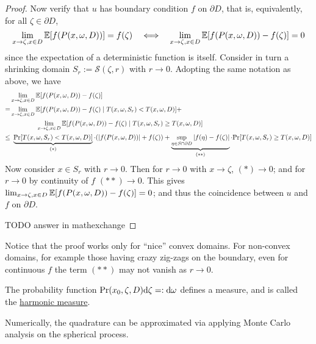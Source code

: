 \documentclass[10pt]{article}
\begin{document}
\begin{proof}
    Now verify that $u$ has boundary condition $f$ on $\partial D$, that is, equivalently, for all $\zeta \in \partial D$,
    \[
        \lim_{x \to \zeta, x \in D} \mathbb{E}[f(P(x, \omega, D))] = f(\zeta)
        \quad \Longleftrightarrow \quad
        \lim_{x \to \zeta, x \in D} \mathbb{E}[f(P(x, \omega, D)) - f(\zeta)] = 0
    \]
    since the expectation of a deterministic function is itself. Consider in turn a shrinking domain $S_r := \mathcal{S}(\zeta, r)$ with $r \to 0$. Adopting the same notation as above, we have
    \begin{align*}
        & \lim_{x \to \zeta, x \in D} \mathbb{E}[f(P(x, \omega, D)) - f(\zeta)] \\
        = & \lim_{x \to \zeta, x \in D} \mathbb{E}[f(P(x, \omega, D)) - f(\zeta) \mid T(x, \omega, S_r) < T(x, \omega, D)] + \\
        & \qquad \qquad \lim_{x \to \zeta, x \in D} \mathbb{E}[f(P(x, \omega, D)) - f(\zeta) \mid T(x, \omega, S_r) \geq T(x, \omega, D)] \\
        \leq &\ \underbrace{\mathrm{Pr}[T(x, \omega, S_r) < T(x, \omega, D)]}_{(\ast)} \cdot (\left|f(P(x, \omega, D))\right| + f(\zeta)) + \underbrace{\sup_{\eta \in S \cap \partial D} \left|f(\eta) - f(\zeta)\right|}_{(\ast\ast)} \cdot \mathrm{Pr}[T(x, \omega, S_r) \geq T(x, \omega, D)]
    \end{align*}
    Now consider $x \in S_r$ with $r \to 0$. Then for $r \to 0$ with $x \to \zeta$, $(\ast) \to 0$; and for $r \to 0$ by continuity of $f$ $(\ast\ast) \to 0$. This gives $\lim_{x \to \zeta, x \in D} \mathbb{E}[f(P(x, \omega, D)) - f(\zeta)] = 0$; and thus the coincidence between $u$ and $f$ on $\partial D$.

    {\color{red} TODO answer in mathexchange}
\end{proof}
\nogap
\begin{remark}
    Notice that the proof works only for ``nice'' convex domains. For non-convex domains, for example those having crazy zig-zags on the boundary, even for continuous $f$ the term $(\ast\ast)$ may not vanish as $r \to 0$. 
\end{remark}

\begin{remark}
    The probability function $\mathrm{Pr}(x_0, \zeta, D) \mathrm{d} \zeta =: \mathrm{d} \omega$ defines a measure, and is called the \underline{harmonic measure}.
\end{remark}

\textstart
Numerically, the quadrature can be approximated via applying Monte Carlo analysis on the spherical process.
\end{document}
